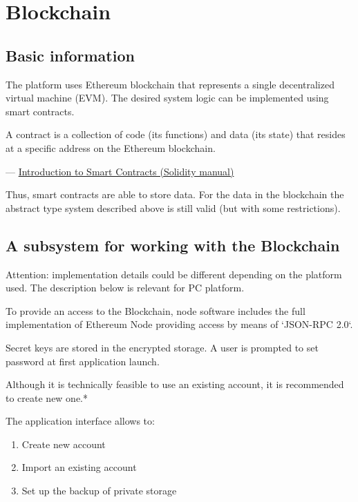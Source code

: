 \section{Blockchain}
\subsection{Basic information}
The platform uses Ethereum blockchain that represents a single decentralized virtual machine (EVM). The desired system logic can be implemented using smart contracts.

\begin{note}[QUOTE]
A contract is a collection of code (its functions) and data (its state) that resides at a specific address on the Ethereum blockchain.

\hfill --- \href{https://solidity.readthedocs.io/en/develop/introduction-to-smart-contracts.html}{Introduction to Smart Contracts (Solidity manual)}
\end{note}




Thus, smart contracts are able to store data. For the data in the blockchain the abstract type system described above is still valid (but with some restrictions).



\subsection{A subsystem for working with the Blockchain}

\begin{note}
  Attention: implementation details could be different depending on the platform used. The description below is relevant for PC platform.
\end{note}

To provide an access to the Blockchain, node software includes the full implementation of Ethereum Node providing access by means of `JSON-RPC 2.0`.

Secret keys are stored in the encrypted storage. A user is prompted to set password at first application launch.

\begin{note}
  Although it is technically feasible to use an existing account, it is recommended to create new one.*
\end{note}

The application interface allows to:
\begin{enumerate}
\item Create new account
\item Import an existing account
\item Set up the backup of private storage
\end{enumerate}

